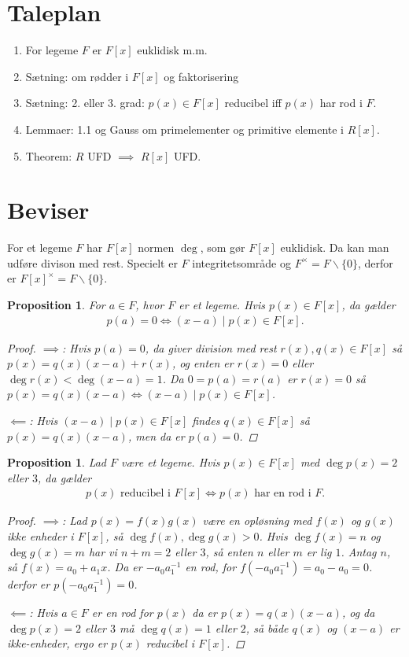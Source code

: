\documentclass[10pt,twoside,openany,final]{memoir}
\theoremstyle{break}
\newtheorem{proposition}[section]{Proposition}
\theoremstyle{Break}
\begin{document}
\section*{Taleplan}
\begin{enumerate}
\item For legeme $F$ er $F[x]$ euklidisk m.m.
\item Sætning: om rødder i $F[x]$ og faktorisering 
\item Sætning: 2. eller 3. grad: $p(x) \in F[x]$ reducibel iff $p(x)$ har rod i $F$.
\item Lemmaer: 1.1 og Gauss om primelementer og primitive elemente i $R[x]$.
\item Theorem: $R$ UFD $\implies$ $R[x]$ UFD.
\end{enumerate}
\section*{Beviser}
For et legeme $F$ har $F[x]$ normen $\deg$, som gør $F[x]$ euklidisk. Da kan man udføre divison med rest. Specielt er $F$ integritetsområde og $F^\times=F\backslash\{0\}$, derfor er $F[x]^\times=F\backslash\{0\}$.
\begin{proposition}
For $a \in F$, hvor $F$  er et legeme. Hvis $p(x) \in F[x]$, da gælder
\begin{align*}
p(a)=0 \iff (x-a) \mid p(x) \in F[x].
\end{align*}
\begin{proof}
$\implies$: Hvis $p(a)=0$, da giver division med rest $r(x),q(x) \in F[x]$ så $p(x)=q(x)(x-a)+r(x)$, og enten er $r(x)=0$ eller $\deg r(x) < \deg (x-a) =1$. Da $0=p(a)=r(a)$ er $r(x)=0$ så $p(x)=q(x)(x-a) \iff (x-a) \mid p(x) \in F[x]$.

\noindent $\impliedby$: Hvis $(x-a) \mid p(x) \in F[x]$ findes $q(x) \in F[x]$ så $p(x)=q(x)(x-a)$, men da er $p(a)=0$.
\end{proof}
\end{proposition}

\begin{proposition}
Lad $F$ være et legeme. Hvis $p(x) \in F[x]$ med $\deg p(x) = 2$ eller $3$, da gælder
\begin{align*}
p(x) \text{ reducibel i } F[x] \iff p(x) \text{ har en rod i }F.
\end{align*}
\begin{proof}
$\implies$: Lad $p(x)=f(x)g(x)$ være en opløsning med $f(x)$ og $g(x)$ ikke enheder i $F[x]$, så $\deg f(x), \deg g(x) >0$. Hvis $\deg f(x)=n$ og $\deg g(x)=m$ har vi $n+m= 2$ eller $3$, så enten $n$ eller $m$ er lig $1$. Antag $n$, så $f(x)=a_0+a_1x$. Da er $-a_0 a_1^{-1}$ en rod, for $f(-a_0 a_1^{-1})=a_0-a_0=0$. derfor er $p(-a_0a_1^{-1})=0$.

\noindent $ \impliedby$: Hvis $a \in F$ er en rod for $p(x)$ da er $p(x)=q(x)(x-a)$, og da $\deg p(x) = 2$ eller $3$ må $\deg q(x) = 1$ eller $2$, så både $q(x)$ og $(x-a)$ er ikke-enheder, ergo er $p(x)$ reducibel i $F[x]$.
\end{proof}
\end{proposition}
\end{document}
